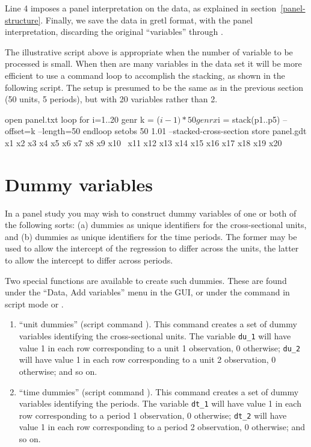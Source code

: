 Line 4 imposes a panel interpretation on the data, as explained in
section~\ref{panel-structure}.  Finally, we save the data in gretl
format, with the panel interpretation, discarding the original
``variables''  through .

The illustrative script above is appropriate when the number of
variable to be processed is small.  When then are many variables in
the data set it will be more efficient to use a command loop to
accomplish the stacking, as shown in the following script.  The setup
is presumed to be the same as in the previous section (50 units, 5
periods), but with 20 variables rather than 2.

\begin{code}
    open panel.txt
    loop for i=1..20
      genr k = ($i - 1) * 50
      genr x$i = stack(p1..p5) --offset=k --length=50
    endloop
    setobs 50 1.01 --stacked-cross-section
    store panel.gdt x1 x2 x3 x4 x5 x6 x7 x8 x9 x10 \
      x11 x12 x13 x14 x15 x16 x17 x18 x19 x20
\end{code}


\section{Dummy variables}
\label{dummies}

In a panel study you may wish to construct dummy variables of one or
both of the following sorts: (a) dummies as unique identifiers for the
cross-sectional units, and (b) dummies as unique identifiers for the
time periods.  The former may be used to allow the intercept of the
regression to differ across the units, the latter to allow the
intercept to differ across periods.

Two special functions are available to create such dummies.  These
are found under the ``Data, Add variables'' menu in the GUI, or under
the \cmd{genr} command in script mode or \app{gretlcli}.

\begin{enumerate}
\item ``unit dummies'' (script command ).  This
  command creates a set of dummy variables identifying the
  cross-sectional units.  The variable \verb+du_1+ will have value 1
  in each row corresponding to a unit 1 observation, 0 otherwise;
  \verb+du_2+ will have value 1 in each row corresponding to a unit 2
  observation, 0 otherwise; and so on.
\item ``time dummies'' (script command ).  This
  command creates a set of dummy variables identifying the periods.
  The variable \verb+dt_1+ will have value 1 in each row
  corresponding to a period 1 observation, 0 otherwise; \verb+dt_2+
  will have value 1 in each row corresponding to a period 2
  observation, 0 otherwise; and so on.
\end{enumerate}


